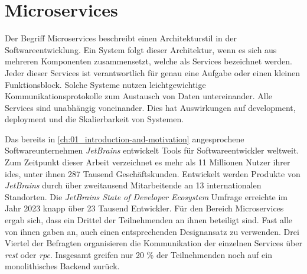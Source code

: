 \section{Microservices}
\label{sec:02-02_microservices}

Der Begriff Microservices beschreibt einen Architekturstil in der Softwareentwicklung. Ein System folgt dieser Architektur, wenn es sich aus mehreren Komponenten zusammensetzt, welche als Services bezeichnet werden. Jeder dieser Services ist verantwortlich für genau eine Aufgabe oder einen kleinen Funktionsblock. Solche Systeme nutzen leichtgewichtige Kommunikationsprotokolle zum Austausch von Daten untereinander. \cite{027:Containerized-Microservices-Deployment-Approach} Alle Services sind unabhängig voneinander. Dies hat Auswirkungen auf \Gls{development}, \Gls{deployment} und die Skalierbarkeit von Systemen. \cite{028:Analyzing-Microservices-and-Monolithic-Systems}

Das bereits in \autoref{ch:01_introduction-and-motivation} angesprochene Softwareunternehmen \textit{JetBrains} entwickelt Tools für Softwareentwickler weltweit. Zum Zeitpunkt dieser Arbeit verzeichnet es mehr als 11 Millionen Nutzer ihrer \Glspl{ide}, unter ihnen 287 Tausend Geschäftskunden. Entwickelt werden Produkte von \textit{JetBrains} durch über zweitausend Mitarbeitende an 13 internationalen Standorten. \cite{210:Jet-Brains-Company} Die \textit{JetBrains State of Developer Ecosystem} Umfrage erreichte im Jahr 2023 knapp über 23 Tausend Entwickler. Für den Bereich Microservices ergab sich, dass ein Drittel der Teilnehmenden an ihnen beteiligt sind. Fast alle von ihnen gaben an, auch einen entsprechenden Designansatz zu verwenden. Drei Viertel der Befragten organisieren die Kommunikation der einzelnen Services über \textit{\Gls{rest}} oder \textit{\Gls{rpc}}. Insgesamt greifen nur 20 \% der Teilnehmenden noch auf ein monolithisches Backend zurück. \cite{207:Developer-Ecosystem}

